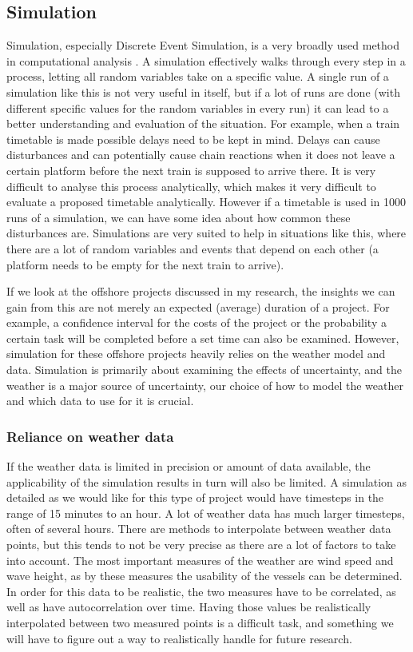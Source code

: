 \documentclass[a4paper,12pt]{article}
\begin{document}
\subsection{Simulation} \label{ss:sim}
Simulation, especially Discrete Event Simulation, is a very broadly used method in computational analysis \cite{law2000simulation,robinson2010conceptual}. A simulation effectively walks through every step in a process, letting all random variables take on a specific value. A single run of a simulation like this is not very useful in itself, but if a lot of runs are done (with different specific values for the random variables in every run) it can lead to a better understanding and evaluation of the situation. For example, when a train timetable is made possible delays need to be kept in mind. Delays can cause disturbances and can potentially cause chain reactions when it does not leave a certain platform before the next train is supposed to arrive there. It is very difficult to analyse this process analytically, which makes it very difficult to evaluate a proposed timetable analytically. However if a timetable is used in 1000 runs of a simulation, we can have some idea about how common these disturbances are. Simulations are very suited to help in situations like this, where there are a lot of random variables and events that depend on each other (a platform needs to be empty for the next train to arrive). 

If we look at the offshore projects discussed in my research, the insights we can gain from this are not merely an expected (average) duration of a project. For example, a confidence interval for the costs of the project or the probability a certain task will be completed before a set time can also be examined. However, simulation for these offshore projects heavily relies on the weather model and data. Simulation is primarily about examining the effects of uncertainty, and the weather is a major source of uncertainty, our choice of how to model the weather and which data to use for it is crucial. 

\subsubsection{Reliance on weather data} \label{sss:weather}
If the weather data is limited in precision or amount of data available, the applicability of the simulation results in turn will also be limited. A simulation as detailed as we would like for this type of project would have timesteps in the range of 15 minutes to an hour. A lot of weather data has much larger timesteps, often of several hours. There are methods to interpolate between weather data points, but this tends to not be very precise as there are a lot of factors to take into account. The most important measures of the weather are wind speed and wave height, as by these measures the usability of the vessels can be determined. In order for this data to be realistic, the two measures have to be correlated, as well as have autocorrelation over time. Having those values be realistically interpolated between two measured points is a difficult task, and something we will have to figure out a way to realistically handle for future research.
\end{document}

